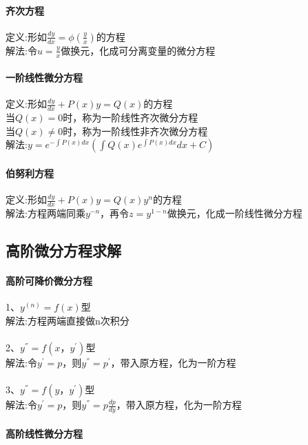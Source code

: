 \documentclass{article}
\begin{document}
\begin{flushleft}
	 \paragraph{齐次方程}
	 定义:形如$\frac{dy}{dx}=\phi(\frac{y}{x})$的方程\\
	 解法:令$u=\frac{y}{x}$做换元，化成可分离变量的微分方程\\
	 
	 \paragraph{一阶线性微分方程}
	 定义:形如$\frac{dy}{dx}+P(x)y=Q(x)$的方程\\
	 当$Q(x)=0$时，称为一阶线性齐次微分方程\\
	 当$Q(x)\neq 0$时，称为一阶线性非齐次微分方程\\
	 解法:$y=e^{-\int P(x)dx}(\int Q(x)e^{\int P(x)dx}dx+C)$\\
	 
	 \paragraph{伯努利方程}
	 定义:形如$\frac{dy}{dx}+P(x)y=Q(x)y^n$的方程\\
	 解法:方程两端同乘$y^{-n}$，再令$z=y^{1-n}$做换元，化成一阶线性微分方程\\
	 
	 \subsection{高阶微分方程求解}
	 
	 \paragraph{高阶可降价微分方程}
	 1、$y^{(n)}=f(x)$型\\
	 解法:方程两端直接做n次积分\\
	 ~\\
	 2、$y^{''}=f(x，y^{'})$型\\
	 解法:令$y^{'}=p$，则$y^{''}=p^{'}$，带入原方程，化为一阶方程\\
	 ~\\
	 3、$y^{''}=f(y，y^{'})$型\\
	 解法:令$y^{'}=p$，则$y^{''}=p\frac{dp}{dy}$，带入原方程，化为一阶方程\\

	 \paragraph{高阶线性微分方程}
	 
\end{flushleft}
\end{document}
